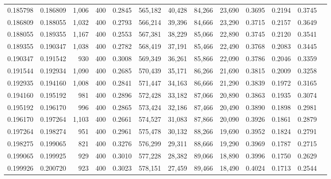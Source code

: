 \begin{tabular}{rrrrrrrrrrrrr}
0.185798 & 0.186809 & 1,006 & 400 &                                     0.2845 & 565,182 &  40,428 &  84,266 &  23,690 & 0.3695 & 0.2194 & 0.3745 \\
0.186809 & 0.188055 & 1,032 & 400 &                                     0.2793 & 566,214 &  39,396 &  84,666 &  23,290 & 0.3715 & 0.2157 & 0.3649 \\
0.188055 & 0.189355 & 1,167 & 400 &                                     0.2553 & 567,381 &  38,229 &  85,066 &  22,890 & 0.3745 & 0.2120 & 0.3541 \\
0.189355 & 0.190347 & 1,038 & 400 &                                     0.2782 & 568,419 &  37,191 &  85,466 &  22,490 & 0.3768 & 0.2083 & 0.3445 \\
0.190347 & 0.191542 &   930 & 400 &                                     0.3008 & 569,349 &  36,261 &  85,866 &  22,090 & 0.3786 & 0.2046 & 0.3359 \\
0.191544 & 0.192934 & 1,090 & 400 &                                     0.2685 & 570,439 &  35,171 &  86,266 &  21,690 & 0.3815 & 0.2009 & 0.3258 \\
0.192935 & 0.194160 & 1,008 & 400 &                                     0.2841 & 571,447 &  34,163 &  86,666 &  21,290 & 0.3839 & 0.1972 & 0.3165 \\
0.194160 & 0.195192 &   981 & 400 &                                     0.2896 & 572,428 &  33,182 &  87,066 &  20,890 & 0.3863 & 0.1935 & 0.3074 \\
0.195192 & 0.196170 &   996 & 400 &                                     0.2865 & 573,424 &  32,186 &  87,466 &  20,490 & 0.3890 & 0.1898 & 0.2981 \\
0.196170 & 0.197264 & 1,103 & 400 &                                     0.2661 & 574,527 &  31,083 &  87,866 &  20,090 & 0.3926 & 0.1861 & 0.2879 \\
0.197264 & 0.198274 &   951 & 400 &                                     0.2961 & 575,478 &  30,132 &  88,266 &  19,690 & 0.3952 & 0.1824 & 0.2791 \\
0.198275 & 0.199065 &   821 & 400 &                                     0.3276 & 576,299 &  29,311 &  88,666 &  19,290 & 0.3969 & 0.1787 & 0.2715 \\
0.199065 & 0.199925 &   929 & 400 &                                     0.3010 & 577,228 &  28,382 &  89,066 &  18,890 & 0.3996 & 0.1750 & 0.2629 \\
0.199926 & 0.200720 &   923 & 400 &                                     0.3023 & 578,151 &  27,459 &  89,466 &  18,490 & 0.4024 & 0.1713 & 0.2544 \\

\end{tabular}
